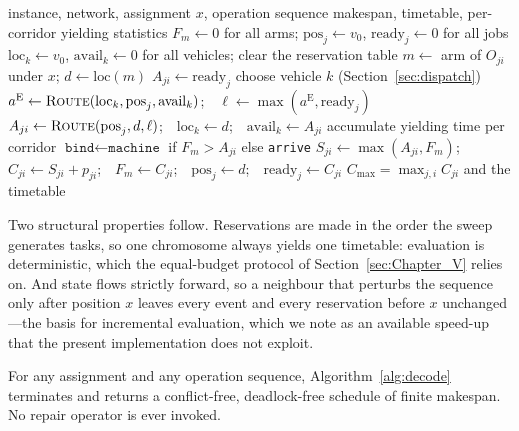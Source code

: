 \documentclass[manuscript,screen,review]{acmart}
\begin{document}
\begin{algorithm}[t]
\caption{\textsc{Decode}: fitness by complete conflict-free simulation}
\label{alg:decode}
\small
\begin{algorithmic}[1]
\Require instance, network, assignment $x$, operation sequence
\Ensure makespan, timetable, per-corridor yielding statistics
\State $F_m\gets 0$ for all arms; $\mathrm{pos}_j\gets v_0$,
       $\mathrm{ready}_j\gets 0$ for all jobs
\State $\mathrm{loc}_k\gets v_0$, $\mathrm{avail}_k\gets 0$ for all vehicles;
       clear the reservation table
  \State $m\gets$ arm of $O_{ji}$ under $x$; $d\gets \mathrm{loc}(m)$
     \State $A_{ji}\gets \mathrm{ready}_j$ 
  \Else
     \State choose vehicle $k$ (Section~\ref{sec:dispatch})
     \State $a^{\mathrm{E}}\gets\textsc{Route}(\mathrm{loc}_k,\mathrm{pos}_j,
            \mathrm{avail}_k)$;\ \ $\ell\gets\max(a^{\mathrm{E}},
            \mathrm{ready}_j)$
     \State $A_{ji}\gets\textsc{Route}(\mathrm{pos}_j,d,\ell)$;\ \
            $\mathrm{loc}_k\gets d$;\ \ $\mathrm{avail}_k\gets A_{ji}$
     \State accumulate yielding time per corridor
  \EndIf
  \State $\texttt{bind}\gets\texttt{machine}$ if $F_m>A_{ji}$ else
         \texttt{arrive}
  \State $S_{ji}\gets\max(A_{ji},F_m)$;\ \ $C_{ji}\gets S_{ji}+p_{ji}$;\ \
         $F_m\gets C_{ji}$;\ \ $\mathrm{pos}_j\gets d$;\ \
         $\mathrm{ready}_j\gets C_{ji}$
\EndFor
\State \Return $C_{\max}=\max_{j,i} C_{ji}$ and the timetable
\end{algorithmic}
\end{algorithm}

Two structural properties follow. Reservations are made in the order the sweep
generates tasks, so one chromosome always yields one timetable: evaluation is
deterministic, which the equal-budget protocol of Section~\ref{sec:Chapter_V}
relies on. And state flows strictly forward, so a neighbour that perturbs the
sequence only after position $x$ leaves every event and every reservation
before $x$ unchanged---the basis for incremental evaluation, which we note as
an available speed-up that the present implementation does not exploit.

\begin{proposition}[Every chromosome decodes]
\label{prop:decodable}
For any assignment and any operation sequence, Algorithm~\ref{alg:decode}
terminates and returns a conflict-free, deadlock-free schedule of finite
makespan. No repair operator is ever invoked.
\end{proposition}
\end{document}
